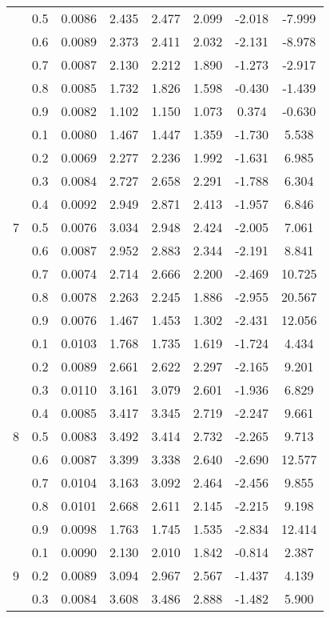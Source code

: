 \documentclass[11pt,a4paper]{report}
\begin{document}
\begin{longtable}{ | c | c || c | c | c | c | c | c | }
 & 0.5 & 0.0086 & 2.435 & 2.477 & 2.099 & -2.018 & -7.999 \\
 & 0.6 & 0.0089 & 2.373 & 2.411 & 2.032 & -2.131 & -8.978 \\
 & 0.7 & 0.0087 & 2.130 & 2.212 & 1.890 & -1.273 & -2.917 \\
 & 0.8 & 0.0085 & 1.732 & 1.826 & 1.598 & -0.430 & -1.439 \\
 & 0.9 & 0.0082 & 1.102 & 1.150 & 1.073 & 0.374 & -0.630 \\
 \hline
\multirow{9}{*}{7} & 0.1 & 0.0080 & 1.467 & 1.447 & 1.359 & -1.730 & 5.538 \\
 & 0.2 & 0.0069 & 2.277 & 2.236 & 1.992 & -1.631 & 6.985 \\
 & 0.3 & 0.0084 & 2.727 & 2.658 & 2.291 & -1.788 & 6.304 \\
 & 0.4 & 0.0092 & 2.949 & 2.871 & 2.413 & -1.957 & 6.846 \\
 & 0.5 & 0.0076 & 3.034 & 2.948 & 2.424 & -2.005 & 7.061 \\
 & 0.6 & 0.0087 & 2.952 & 2.883 & 2.344 & -2.191 & 8.841 \\
 & 0.7 & 0.0074 & 2.714 & 2.666 & 2.200 & -2.469 & 10.725 \\
 & 0.8 & 0.0078 & 2.263 & 2.245 & 1.886 & -2.955 & 20.567 \\
 & 0.9 & 0.0076 & 1.467 & 1.453 & 1.302 & -2.431 & 12.056 \\
 \hline
\multirow{9}{*}{8} & 0.1 & 0.0103 & 1.768 & 1.735 & 1.619 & -1.724 & 4.434 \\
 & 0.2 & 0.0089 & 2.661 & 2.622 & 2.297 & -2.165 & 9.201 \\
 & 0.3 & 0.0110 & 3.161 & 3.079 & 2.601 & -1.936 & 6.829 \\
 & 0.4 & 0.0085 & 3.417 & 3.345 & 2.719 & -2.247 & 9.661 \\
 & 0.5 & 0.0083 & 3.492 & 3.414 & 2.732 & -2.265 & 9.713 \\
 & 0.6 & 0.0087 & 3.399 & 3.338 & 2.640 & -2.690 & 12.577 \\
 & 0.7 & 0.0104 & 3.163 & 3.092 & 2.464 & -2.456 & 9.855 \\
 & 0.8 & 0.0101 & 2.668 & 2.611 & 2.145 & -2.215 & 9.198 \\
 & 0.9 & 0.0098 & 1.763 & 1.745 & 1.535 & -2.834 & 12.414 \\
 \hline
\multirow{9}{*}{9} & 0.1 & 0.0090 & 2.130 & 2.010 & 1.842 & -0.814 & 2.387 \\
 & 0.2 & 0.0089 & 3.094 & 2.967 & 2.567 & -1.437 & 4.139 \\
 & 0.3 & 0.0084 & 3.608 & 3.486 & 2.888 & -1.482 & 5.900 \\

\end{longtable}
\end{document}
